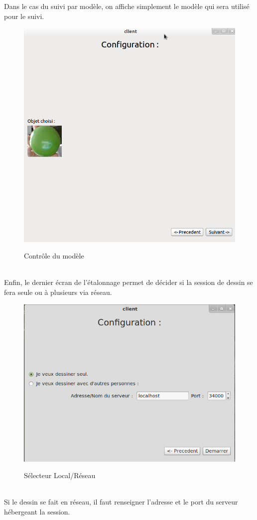 \documentclass{report}
\begin{document}
				Dans le cas du suivi par modèle, on affiche simplement le modèle qui sera utilisé pour le suivi.
				\begin{figure}[!h]
						\centering
						\includegraphics[scale=0.38]{../images/Capture7.png}\\
						\caption{Contrôle du modèle}
						\label{Contrôle du modèle}
				\end{figure}\\
				\newpage
				Enfin, le dernier écran de l'étalonnage permet de décider si la session de dessin se fera seule ou à plusieurs via réseau.
				\begin{figure}[!h]
						\centering
						\includegraphics[scale=0.4]{../images/capture_choix.png}\\
						\caption{Sélecteur Local/Réseau}
						\label{Sélecteur Local/Réseau}
				\end{figure}\\
				Si le dessin se fait en réseau, il faut renseigner l'adresse et le port du serveur hébergeant la session.
				\newpage
\end{document}
